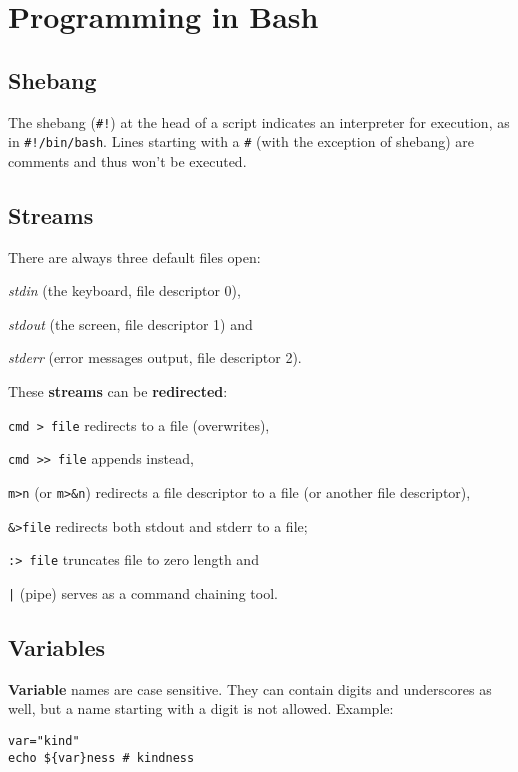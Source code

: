 \section{Programming in Bash}
\subsection{Shebang}
The shebang (\texttt{\#!}) at the head of a script indicates an 
interpreter for execution, as in \texttt{\#!/bin/bash}.
Lines starting with a \texttt{\#} (with the exception of shebang) 
are comments and thus won't be executed.

\subsection{Streams}
There are always three default files open:
\begin{enumx}
\item \emph{stdin} (the keyboard, file descriptor 0),
\item \emph{stdout} (the screen, file descriptor 1) and
\item \emph{stderr} (error messages output, file descriptor 2).
\end{enumx}

These \textbf{streams} can be \textbf{redirected}:
\begin{itemx} 
\item \texttt{cmd > file} redirects to a file (overwrites),
\item \texttt{cmd >{}> file} appends instead,
\item \texttt{m>n} (or \texttt{m>\&n}) redirects a file descriptor to a file 
(or another file descriptor), 
\item \texttt{\&>file} redirects both stdout and stderr to a file;
\item \texttt{:> file} truncates file to zero length and
\item \texttt{|} (pipe) serves as a command chaining tool.
\end{itemx}

\subsection{Variables}
\textbf{Variable} names are case sensitive.
They can contain digits and underscores as well,
but a name starting with a digit is not allowed.
Example: 
\begin{verbatim}
var="kind"
echo ${var}ness # kindness
\end{verbatim}

